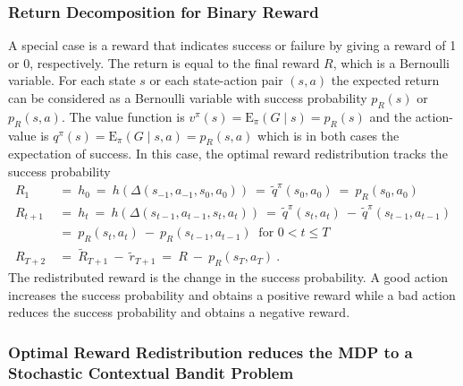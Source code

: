 \documentclass{article}
\newcommand\EXP{\mathbf{\mathrm{E}}}
\renewcommand{\leq}{\leqslant}
\begin{document}
\begin{appendices}
\subsubsection{Return Decomposition for Binary Reward}
A special case is a reward that indicates success or failure by giving 
a reward of 1 or 0, respectively. 
The return is equal to the final reward $R$, which is a Bernoulli variable.
For each state $s$ or each
state-action pair $(s,a)$ the expected return can be 
considered as a Bernoulli variable with success probability
$p_R(s)$ or $p_R(s,a)$. The value function is $v^\pi(s)=\EXP_{\pi}(G \mid s)=p_R(s)$
and  the action-value is $q^\pi(s)=\EXP_{\pi}(G \mid s,a)=p_R(s,a)$ which is in 
both cases the expectation of success. 
In this case, the optimal reward redistribution tracks the success probability
\begin{align}
  R_1 \ &= \ h_0 \ = \ h(\Delta(s_{-1},a_{-1},s_0,a_0)) \ = \ \tilde{q}^\pi(s_0,a_0) \ = \ p_R(s_0,a_0)\\
  R_{t+1} \ &= \ h_t \ = \ h(\Delta(s_{t-1},a_{t-1},s_t,a_t))\ = \ \tilde{q}^\pi(s_t,a_t) \ - \  \tilde{q}^\pi(s_{t-1},a_{t-1}) \\ \nonumber &= \
  p_R(s_t,a_t) \ - \ p_R(s_{t-1},a_{t-1})
  \ \text{ for } 0<t\leq T \\
  R_{T+2} \ &= \ \tilde{R}_{T+1} \ - \ \tilde{r}_{T+1} \ = \ R \ - \ p_R(s_T,a_T)  \ .
\end{align} 
The redistributed reward is the change in the success probability. A good action
increases the success probability and obtains a positive reward while a bad action
reduces the success probability and obtains a negative reward.


\subsubsection{Optimal Reward Redistribution reduces the MDP 
to a Stochastic Contextual Bandit Problem}


\end{appendices}
\end{document}
